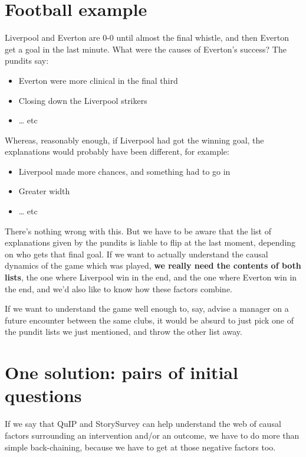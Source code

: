 \documentclass[
]{book}
\providecommand{\tightlist}{%
  \setlength{\itemsep}{0pt}\setlength{\parskip}{0pt}}
\begin{document}
\hypertarget{football-example}{%
\section{Football example}\label{football-example}}

Liverpool and Everton are 0-0 until almost the final whistle, and then Everton get a goal in the last minute. What were the causes of Everton's success? The pundits say:

\begin{itemize}
\tightlist
\item
  Everton were more clinical in the final third
\item
  Closing down the Liverpool strikers
\item
  \ldots{} etc
\end{itemize}

Whereas, reasonably enough, if Liverpool had got the winning goal, the explanations would probably have been different, for example:

\begin{itemize}
\tightlist
\item
  Liverpool made more chances, and something had to go in
\item
  Greater width
\item
  \ldots{} etc
\end{itemize}

There's nothing wrong with this. But we have to be aware that the list of explanations given by the pundits is liable to flip at the last moment, depending on who gets that final goal. If we want to actually understand the causal dynamics of the game which was played, \textbf{we really need the contents of both lists}, the one where Liverpool win in the end, and the one where Everton win in the end, and we'd also like to know how these factors combine.

If we want to understand the game well enough to, say, advise a manager on a future encounter between the same clubs, it would be absurd to just pick one of the pundit lists we just mentioned, and throw the other list away.

\hypertarget{one-solution-pairs-of-initial-questions}{%
\section{One solution: pairs of initial questions}\label{one-solution-pairs-of-initial-questions}}

If we say that QuIP and StorySurvey can help understand the web of causal factors surrounding an intervention and/or an outcome, we have to do more than simple back-chaining, because we have to get at those negative factors too.
\end{document}
